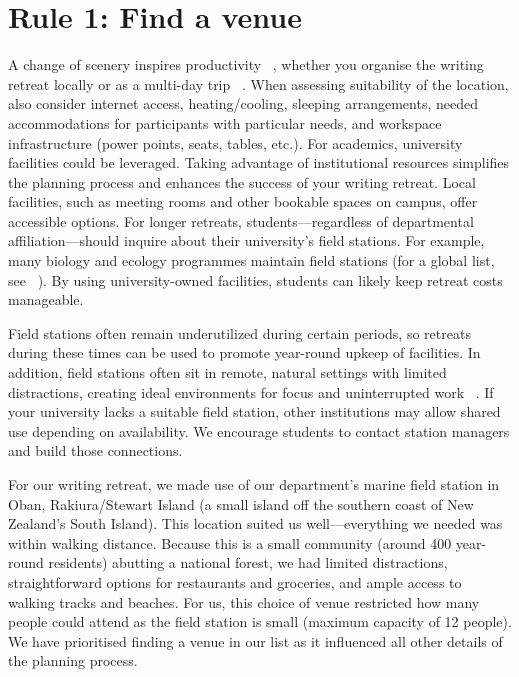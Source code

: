 \documentclass[10pt,letterpaper]{article}
\begin{document}
\section*{Rule 1: Find a venue}

A change of scenery inspires productivity ~\cite{murray2013}, whether you organise the writing retreat locally or as a multi-day trip ~\cite{quynn2021sustainable}. When assessing suitability of the location, also consider internet access, heating/cooling, sleeping arrangements, needed accommodations for participants with particular needs, and workspace infrastructure (power points, seats, tables, etc.). For academics, university facilities could be leveraged. Taking advantage of institutional resources simplifies the planning process and enhances the success of your writing retreat. Local facilities, such as meeting rooms and other bookable spaces on campus, offer accessible options. For longer retreats, students---regardless of departmental affiliation---should inquire about their university's field stations. For example, many biology and ecology programmes maintain field stations (for a global list, see ~\cite{tydecks2016}). By using university-owned facilities, students can likely keep retreat costs manageable. 

Field stations often remain underutilized during certain periods, so retreats during these times can be used to promote year-round upkeep of facilities. In addition, field stations often sit in remote, natural settings with limited distractions, creating ideal environments for focus and uninterrupted work ~\cite{murray2013, tremblay2021}. If your university lacks a suitable field station, other institutions may allow shared use depending on availability. We encourage students to contact station managers and build those connections.

For our writing retreat, we made use of our department's marine field station in Oban, Rakiura/Stewart Island (a small island off the southern coast of New Zealand's South Island). This location suited us well---everything we needed was within walking distance. Because this is a small community (around 400 year-round residents) abutting a national forest, we had limited distractions, straightforward options for restaurants and groceries, and ample access to walking tracks and beaches. For us, this choice of venue restricted how many people could attend as the field station is small (maximum capacity of 12 people). We have prioritised finding a venue in our list as it influenced all other details of the planning process.
\end{document}

